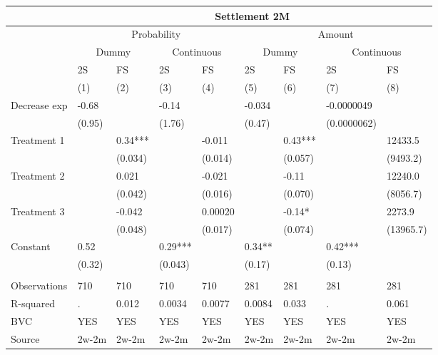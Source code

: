 \begin{tabular}{lllllllll}
      & \multicolumn{8}{c}{Settlement 2M} \\
\midrule
      & \multicolumn{4}{c}{Probability} & \multicolumn{4}{c}{Amount} \\
\midrule
\midrule
      & \multicolumn{2}{c}{Dummy} & \multicolumn{2}{c}{Continuous} & \multicolumn{2}{c}{Dummy} & \multicolumn{2}{c}{Continuous} \\
\midrule
      & 2S    & FS    & 2S    & FS    & 2S    & FS    & 2S    & FS \\
\midrule
\midrule
      & (1)   & (2)   & (3)   & (4)   & (5)   & (6)   & (7)   & (8) \\
\midrule
\midrule
Decrease exp & -0.68 &       & -0.14 &       & -0.034 &       & -0.0000049 &  \\
      & (0.95) &       & (1.76) &       & (0.47) &       & (0.0000062) &  \\
Treatment 1  &       & 0.34*** &       & -0.011 &       & 0.43*** &       & 12433.5 \\
      &       & (0.034) &       & (0.014) &       & (0.057) &       & (9493.2) \\
Treatment 2 &       & 0.021 &       & -0.021 &       & -0.11 &       & 12240.0 \\
      &       & (0.042) &       & (0.016) &       & (0.070) &       & (8056.7) \\
Treatment 3 &       & -0.042 &       & 0.00020 &       & -0.14* &       & 2273.9 \\
      &       & (0.048) &       & (0.017) &       & (0.074) &       & (13965.7) \\
Constant & 0.52  &       & 0.29*** &       & 0.34** &       & 0.42*** &  \\
      & (0.32) &       & (0.043) &       & (0.17) &       & (0.13) &  \\
      &       &       &       &       &       &       &       &  \\
\midrule
Observations & 710   & 710   & 710   & 710   & 281   & 281   & 281   & 281 \\
R-squared & .     & 0.012 & 0.0034 & 0.0077 & 0.0084 & 0.033 & .     & 0.061 \\
BVC   & YES   & YES   & YES   & YES   & YES   & YES   & YES   & YES \\
Source & 2w-2m & 2w-2m & 2w-2m & 2w-2m & 2w-2m & 2w-2m & 2w-2m & 2w-2m \\
\bottomrule
\bottomrule
\end{tabular}%
